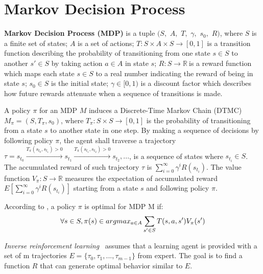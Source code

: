 \section{Markov Decision Process}
\begin{definition}
\textbf{Markov Decision Process (MDP)} is a tuple $(S,$ $A,$ $T,$ $\gamma,$ $s_0,$ $R)$, where $S$ is a finite set of states; $A$ is a set of actions; $T: S\times A\times S\rightarrow [0, 1]$ is a transition function describing the probability of transitioning from one state $s\in S$ to another $s'\in S$ by taking action $a\in A$ in state $s$; $R: S\to \mathbb{R}\ $is a reward function which maps each state $s\in S$ to a real number indicating the reward of being in state $s$; $s_0\in S$ is the initial state; $\gamma \in [0, 1)$ is a discount factor which describes how future rewards attenuate when a sequence of transitions is made.
\end{definition}
A policy $\pi$ for an MDP $M$ induces a Discrete-Time Markov Chain (DTMC) $M_{\pi}=(S, T_\pi, s_0)$, where $T_\pi:S\times S\to [0, 1]$ is the probability of transitioning from a state $s$ to another state in one step. By making a sequence of decisions by following policy $\pi$, the agent shall traverse a trajectory $\tau = s_{t_0}\xrightarrow{T_\pi(s_{t_0}, s_{t_1})>0} s_{t_1}\xrightarrow{T_\pi(s_{t_1}, s_{t_2})>0} s_{t_2}, ...$, is a sequence of states where $s_{t_i}\in S$. The accumulated reward of such trajectory $\tau$ is $\sum_{i=0}^\infty \gamma^i R(s_{t_i})$. The value function $V_\pi: S\to \mathbb{R}$ measures the expectation of accumulated reward $E[\sum\limits_{i=0}^{\infty}\gamma^i R(s_{t_i})]$ starting from a state $s$ and following policy $\pi$. 

According to \cite{bellman}, a policy $\pi$ is optimal for MDP M if:
\begin{equation}
\centering
\forall s\in S, \pi(s)\in argmax_{a\in A}  \sum_{s'\in S} T(s, a, s')V_{\pi}(s')
\end{equation}


\emph{Inverse reinforcement learning}~\cite{Ng:2000:AIR:645529.657801} assumes that a learning agent is provided with a set of m trajectories $E=\{\tau_0, \tau_1, ..., \tau_{m-1}\}$ from expert. The goal is to find a function $R$ that can generate optimal behavior similar to $E$. 

